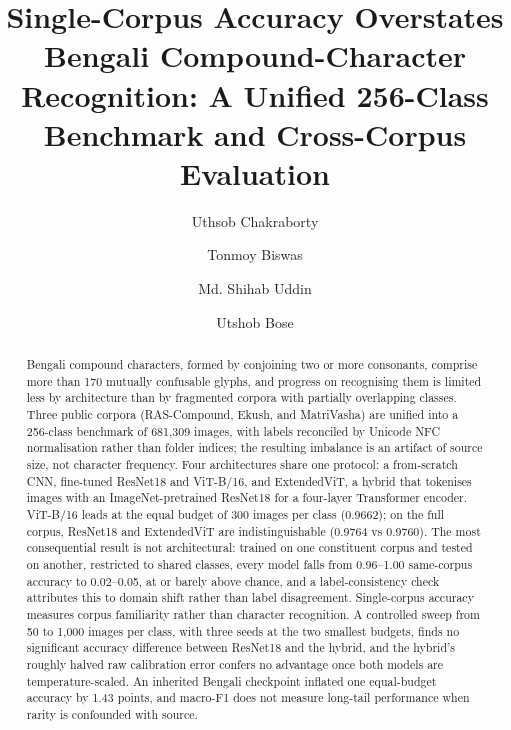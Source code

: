 \documentclass[5p,10pt]{elsarticle}
\begin{document}
\begin{frontmatter}

\title{Single-Corpus Accuracy Overstates Bengali Compound-Character Recognition: A Unified 256-Class Benchmark and Cross-Corpus Evaluation}

\author[inst1]{Uthsob Chakraborty}
\author[inst1]{Tonmoy Biswas}
\author[inst1]{Md. Shihab Uddin}
\author[inst2]{Utshob Bose}

\address[inst1]{Department of Software Engineering, Daffodil International University, Dhaka, Bangladesh}
\address[inst2]{BRAC University, Dhaka, Bangladesh}

\begin{abstract}
Bengali compound characters, formed by conjoining two or more consonants, comprise more than 170 mutually confusable glyphs, and progress on recognising them is limited less by architecture than by fragmented corpora with partially overlapping classes. Three public corpora (RAS-Compound, Ekush, and MatriVasha) are unified into a 256-class benchmark of 681,309 images, with labels reconciled by Unicode NFC normalisation rather than folder indices; the resulting imbalance is an artifact of source size, not character frequency. Four architectures share one protocol: a from-scratch CNN, fine-tuned ResNet18 and ViT-B/16, and ExtendedViT, a hybrid that tokenises images with an ImageNet-pretrained ResNet18 for a four-layer Transformer encoder. ViT-B/16 leads at the equal budget of 300 images per class (0.9662); on the full corpus, ResNet18 and ExtendedViT are indistinguishable (0.9764 vs 0.9760). The most consequential result is not architectural: trained on one constituent corpus and tested on another, restricted to shared classes, every model falls from 0.96--1.00 same-corpus accuracy to 0.02--0.05, at or barely above chance, and a label-consistency check attributes this to domain shift rather than label disagreement. Single-corpus accuracy measures corpus familiarity rather than character recognition. A controlled sweep from 50 to 1,000 images per class, with three seeds at the two smallest budgets, finds no significant accuracy difference between ResNet18 and the hybrid, and the hybrid's roughly halved raw calibration error confers no advantage once both models are temperature-scaled. An inherited Bengali checkpoint inflated one equal-budget accuracy by 1.43 points, and macro-F1 does not measure long-tail performance when rarity is confounded with source.
\end{abstract}


\end{frontmatter}
\end{document}
